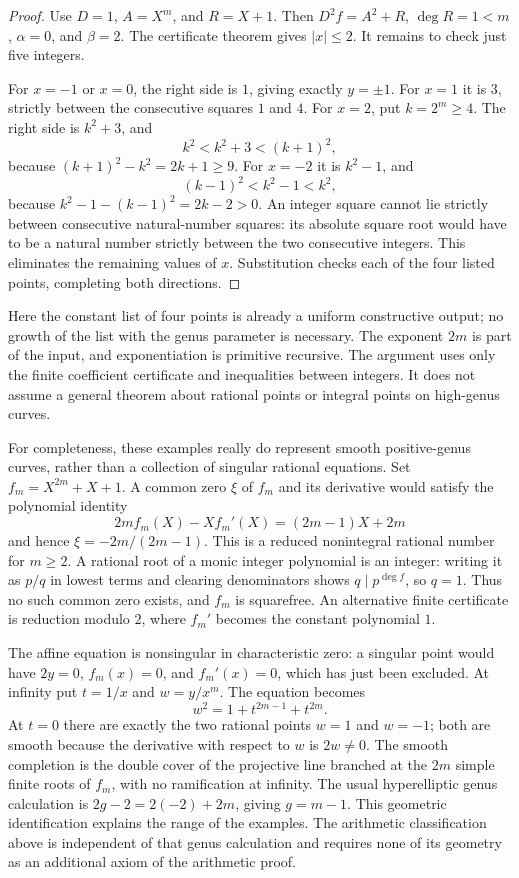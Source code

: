 \begin{proof}
Use $D=1$, $A=X^m$, and $R=X+1$.  Then
$D^2f=A^2+R$, $\deg R=1<m$, $\alpha=0$, and $\beta=2$.
The certificate theorem gives $|x|\leq2$.  It remains to check just five
integers.

For $x=-1$ or $x=0$, the right side is $1$, giving exactly $y=\pm1$.
For $x=1$ it is $3$, strictly between the consecutive squares $1$ and $4$.
For $x=2$, put $k=2^m\geq4$.  The right side is $k^2+3$, and
\[
                         k^2<k^2+3<(k+1)^2,
\]
because $(k+1)^2-k^2=2k+1\geq9$.  For $x=-2$ it is $k^2-1$, and
\[
                        (k-1)^2<k^2-1<k^2,
\]
because $k^2-1-(k-1)^2=2k-2>0$.
An integer square cannot lie strictly between consecutive natural-number
squares: its absolute square root would have to be a natural number
strictly between the two consecutive integers.  This eliminates the
remaining values of $x$.  Substitution checks each of the four listed
points, completing both directions.
\end{proof}

Here the constant list of four points is already a uniform constructive
output; no growth of the list with the genus parameter is necessary.
The exponent $2m$ is part of the input, and exponentiation is primitive
recursive.  The argument uses only the finite coefficient certificate and
inequalities between integers.  It does not assume a general theorem
about rational points or integral points on high-genus curves.

For completeness, these examples really do represent smooth positive-genus
curves, rather than a collection of singular rational equations.  Set
$f_m=X^{2m}+X+1$.  A common zero $\xi$ of $f_m$ and its derivative would
satisfy the polynomial identity
\[
       2m f_m(X)-X f_m'(X)=(2m-1)X+2m
\]
and hence $\xi=-2m/(2m-1)$.  This is a reduced nonintegral rational number
for $m\geq2$.  A rational root of a monic integer polynomial is an integer:
writing it as $p/q$ in lowest terms and clearing denominators shows
$q\mid p^{\deg f}$, so $q=1$.  Thus no such common zero exists, and $f_m$
is squarefree.  An alternative finite certificate is reduction modulo
$2$, where $f_m'$ becomes the constant polynomial $1$.

The affine equation is nonsingular in characteristic zero: a singular
point would have $2y=0$, $f_m(x)=0$, and $f_m'(x)=0$, which has just been
excluded.  At infinity put $t=1/x$ and $w=y/x^m$.  The equation becomes
\[
                         w^2=1+t^{2m-1}+t^{2m}.
\]
At $t=0$ there are exactly the two rational points $w=1$ and $w=-1$;
both are smooth because the derivative with respect to $w$ is $2w\neq0$.
The smooth completion is the double cover of the projective line branched
at the $2m$ simple finite roots of $f_m$, with no ramification at infinity.
The usual hyperelliptic genus calculation is
$2g-2=2(-2)+2m$, giving $g=m-1$.  This geometric identification explains
the range of the examples.  The arithmetic classification above is
independent of that genus calculation and requires none of its geometry
as an additional axiom of the arithmetic proof.

